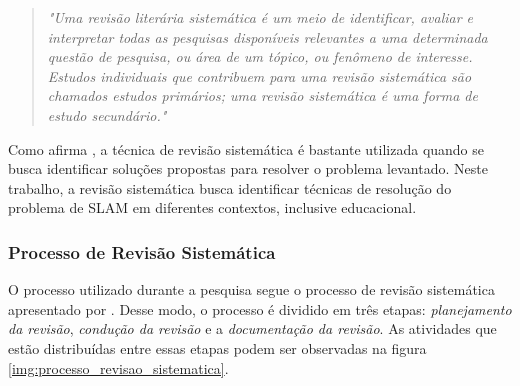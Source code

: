 	 \begin{quote}
	 	\textit{"Uma revisão literária sistemática é um meio de identificar, avaliar e interpretar
		todas as pesquisas disponíveis relevantes a uma determinada questão de pesquisa,
		ou área de um tópico, ou fenômeno de interesse. Estudos individuais que contribuem
		para uma revisão sistemática são chamados estudos primários; uma revisão
		sistemática é uma forma de estudo secundário."}
	 \end{quote}

	 Como afirma \cite{revisaoSistematicaComunicacao}, a técnica de revisão sistemática é bastante utilizada quando se busca identificar soluções propostas para resolver o problema levantado. Neste trabalho, a revisão sistemática busca identificar técnicas de resolução do problema de SLAM em diferentes contextos, inclusive educacional.

	 \subsubsection{Processo de Revisão Sistemática}

	 	O processo utilizado durante a pesquisa segue o processo de revisão sistemática apresentado por \cite{Kitchenham}. Desse modo, o processo é dividido em três etapas: \textit{planejamento da revisão}, \textit{condução da revisão} e a \textit{documentação da revisão}. As atividades que estão distribuídas entre essas etapas podem ser observadas na figura \ref{img:processo_revisao_sistematica}.

